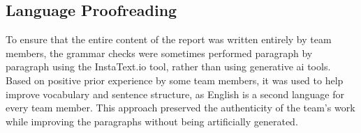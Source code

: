 \subsection{Language Proofreading}
To ensure that the entire content of the report was written entirely by team members, the grammar checks were sometimes performed paragraph by paragraph using the InstaText.io tool, rather than using generative \acrshort{ai} tools. Based on positive prior experience by some team members, it was used to help improve vocabulary and sentence structure, as English is a second language for every team member. This approach preserved the authenticity of the team’s work while improving the paragraphs without being artificially generated.